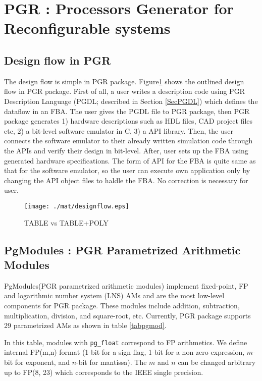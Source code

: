 \documentclass{llncs}
\begin{document}
%
\section{PGR : Processors Generator for Reconfigurable systems}
\label{Sec_PGR}

\subsection{Design flow in PGR}

The design flow is simple in PGR package.
Figure\ref{PGRFLOW} shows the outlined design flow in PGR package.
First of all, a user writes a
description code using PGR Description Language (PGDL; described in
Section \ref{SecPGDL}) which defines the dataflow in an FBA.  The user
gives the PGDL file to PGR package, then PGR package generates 1)
hardware descriptions such as HDL files, CAD project files etc, 2) a
bit-level software emulator in C, 3) a API library.  Then, the user
connects the software emulator to their already written simulation
code through the APIs and verify their design in bit-level.  After,
user sets up the FBA using generated hardware specifications.  The
form of API for the FBA is quite same as that for the software
emulator, so the user can execute own application only by changing the
API object files to haldle the FBA. No correction is necessary for
user.

\begin{figure}[htb]
\begin{center}
  \texttt{[image: ./mat/designflow.eps]}
  \caption{TABLE vs TABLE+POLY}
  \label{PGRFLOW}
\end{center}
\end{figure}


\subsection{PgModules : PGR Parametrized Arithmetic Modules}

PgModules(PGR parametrized arithmetic modules) implement fixed-point, 
FP and logarithmic number system (LNS) AMs and 
are the most low-level components for PGR package.
These modules include addition, subtraction, multiplication, division, and square-root, etc. 
Currently, PGR package supports
29 parametrized AMs as shown in table \ref{tabpgmod}.

In this table, modules with {\tt pg\_float} correspond to FP
arithmetics.  We define internal FP(m,n) format (1-bit
for a sign flag, 1-bit for a non-zero expression, $m$-bit for
exponent, and $n$-bit for mantissa). The $m$ and $n$ can be changed
arbitrary up to FP(8, 23) which corresponds to the IEEE single
precision.
\end{document}
